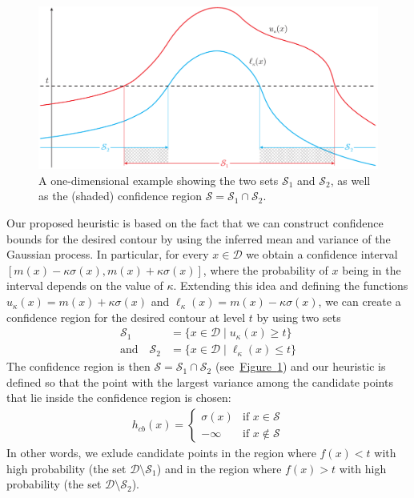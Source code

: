 \documentclass[11pt]{article} %
\newcommand{\figref}[1]{\hyperref[#1]{\mbox{Figure~\ref*{#1}}}}
\newcommand{\twopartdef}[4]
{
	\left\{
		\begin{array}{ll}
			#1 & \mbox{if } #2 \\
			#3 & \mbox{if } #4
		\end{array}
	\right.
}
\begin{document}
\begin{figure}[tb]
  \centering
  \includegraphics[width=\textwidth]{figures/cb}
  \caption{A one-dimensional example showing the two sets $\mathcal{S}_1$ and
           $\mathcal{S}_2$, as well as the (shaded) confidence region
           $\mathcal{S} = \mathcal{S}_1\cap\mathcal{S}_2$.}
  \label{fig:cb}
\end{figure}

Our proposed heuristic is based on the fact that we can construct confidence
bounds for the desired contour by using the inferred mean and variance of
the Gaussian process. In particular, for every $x \in \mathcal{D}$ we obtain
a confidence interval ${[m(x) - \kappa\sigma(x), m(x) + \kappa\sigma(x)]}$,
where the probability of $x$ being in the interval depends on the value
of $\kappa$. Extending this idea and defining the functions
$u_{\kappa}(x) = m(x) + \kappa\sigma(x)$ and
$\ell_{\kappa}(x) = m(x) - \kappa\sigma(x)$,
we can create a confidence region for
the desired contour at level $t$ by using two sets
\begin{align*}
  \mathcal{S}_1 &= \{x \in \mathcal{D} \mid u_{\kappa}(x) \geq t\}\\
  \text{and}\hspace{1em}
  \mathcal{S}_2 &= \{x \in \mathcal{D} \mid \ell_{\kappa}(x) \leq t\}
\end{align*}
The confidence region is then
$\mathcal{S} = \mathcal{S}_1\cap\mathcal{S}_2$ (see~\figref{fig:cb}) and our
heuristic is defined
so that the point with the largest variance among the candidate points that
lie inside the confidence region is chosen:
\begin{align}\label{eq:hcb}
  h_{cb}(x) = \twopartdef { \sigma(x) } {x \in \mathcal{S}} {-\infty} {x \notin \mathcal{S}}
\end{align}
In other words, we exlude candidate points in the region where
$f(x) < t$ with high probability (the set $\mathcal{D}\setminus\mathcal{S}_1$)
and in the region where $f(x) > t$ with high probability
(the set $\mathcal{D}\setminus\mathcal{S}_2$).
\end{document}
